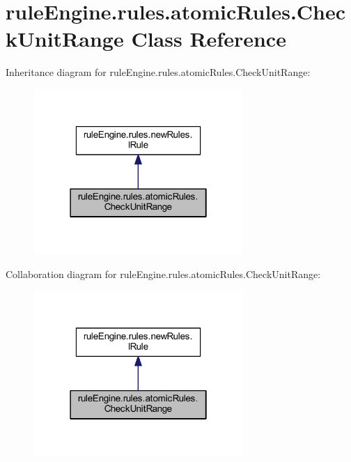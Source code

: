 \hypertarget{classrule_engine_1_1rules_1_1atomic_rules_1_1_check_unit_range}{}\section{rule\+Engine.\+rules.\+atomic\+Rules.\+Check\+Unit\+Range Class Reference}
\label{classrule_engine_1_1rules_1_1atomic_rules_1_1_check_unit_range}


Inheritance diagram for rule\+Engine.\+rules.\+atomic\+Rules.\+Check\+Unit\+Range\+:
\nopagebreak
\begin{figure}[H]
\begin{center}
\leavevmode
\includegraphics[width=226pt]{classrule_engine_1_1rules_1_1atomic_rules_1_1_check_unit_range__inherit__graph}
\end{center}
\end{figure}


Collaboration diagram for rule\+Engine.\+rules.\+atomic\+Rules.\+Check\+Unit\+Range\+:
\nopagebreak
\begin{figure}[H]
\begin{center}
\leavevmode
\includegraphics[width=226pt]{classrule_engine_1_1rules_1_1atomic_rules_1_1_check_unit_range__coll__graph}
\end{center}
\end{figure}
